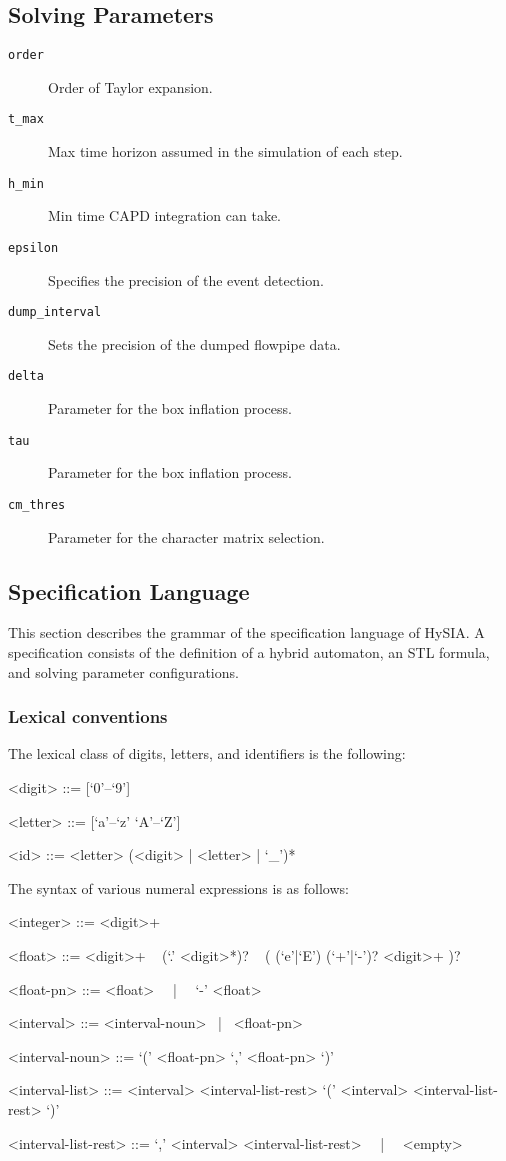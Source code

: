 \documentclass[10pt,a4paper]{article}
\begin{document}
\subsection{Solving Parameters}

\begin{description}
\item[\texttt{order}] Order of Taylor expansion.
\item[\texttt{t_max}] Max time horizon assumed in the simulation of each step.
\item[\texttt{h_min}] Min time CAPD integration can take.
\item[\texttt{epsilon}] Specifies the precision of the event detection.
\item[\texttt{dump_interval}] Sets the precision of the dumped flowpipe data.
\item[\texttt{delta}] Parameter for the box inflation process.
\item[\texttt{tau}] Parameter for the box inflation process.
\item[\texttt{cm_thres}] Parameter for the character matrix selection.
\end{description}


\subsection{Specification Language}

This section describes the grammar of the specification language of HySIA.
A specification consists of the definition of a hybrid automaton, an STL formula, and solving parameter configurations.

\subsubsection{Lexical conventions}

The lexical class of digits, letters, and identifiers is the following:
\begin{grammar}
<digit> ::= [`0'--`9']

<letter> ::= [`a'--`z' `A'--`Z']

<id> ::= <letter> (<digit> | <letter> | `_')*
\end{grammar}

The syntax of various numeral expressions is as follows:
\begin{grammar}
<integer> ::= <digit>+

<float> ::= 
<digit>+ ~ (`.' <digit>*)? ~ ( (`e'|`E') (`+'|`-')? <digit>+ )?

<float-pn> ::= <float> ~~|~~ `-' <float>

<interval> ::= <interval-noun> ~|~ <float-pn>

<interval-noun> ::= `(' <float-pn> `,' <float-pn> `)'

<interval-list> ::= <interval> <interval-list-rest>
\alt `(' <interval> <interval-list-rest> `)'

<interval-list-rest> ::= `,' <interval> <interval-list-rest> ~~|~~ <empty>
\end{grammar}
\end{document}
